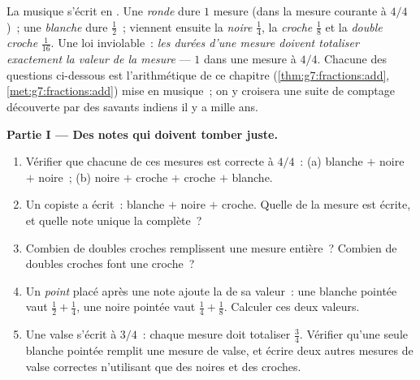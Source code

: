 \begin{problem}
\label{pb:g7:fractions:1}
La musique s'écrit en . Une \emph{ronde} dure $1$ mesure
(dans la mesure courante à $4/4$)~; une \emph{blanche} dure
$\frac12$~; viennent ensuite la \emph{noire} $\frac14$, la
\emph{croche} $\frac18$ et la \emph{double croche} $\frac{1}{16}$.
Une loi inviolable~: \emph{les durées d'une mesure doivent totaliser
exactement la valeur de la mesure} --- $1$ dans une mesure à $4/4$.
Chacune des questions ci-dessous est l'arithmétique de ce chapitre
(\cref{thm:g7:fractions:add}, \cref{met:g7:fractions:add}) mise en
musique~; on y croisera une suite de comptage découverte par des
savants indiens il y a mille ans.

\medskip
\noindent\textbf{Partie I --- Des notes qui doivent tomber juste.}
\begin{enumerate}
  \item Vérifier que chacune de ces mesures est correcte à $4/4$~:
        (a) blanche $+$ noire $+$ noire~; (b) noire $+$ croche $+$
        croche $+$ blanche.
  \item Un copiste a écrit~: blanche $+$ noire $+$ croche. Quelle
         de la mesure est écrite, et quelle note unique la
        complète~?
  \item Combien de doubles croches remplissent une mesure entière~?
        Combien de doubles croches font une croche~?
  \item Un \emph{point} placé après une note ajoute la  de sa
        valeur~: une blanche pointée vaut $\frac12 + \frac14$, une
        noire pointée vaut $\frac14 + \frac18$. Calculer ces deux
        valeurs.
  \item Une valse s'écrit à $3/4$~: chaque mesure doit totaliser
        $\frac34$. Vérifier qu'une seule blanche pointée remplit une
        mesure de valse, et écrire deux autres mesures de valse
        correctes n'utilisant que des noires et des croches.
\end{enumerate}


\end{problem}
